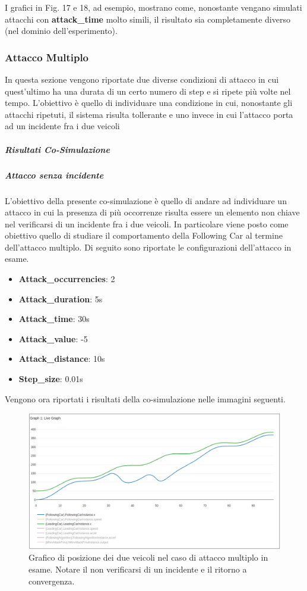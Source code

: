 I grafici in Fig. 17 e 18, ad esempio, mostrano come, nonostante vengano simulati attacchi con \textbf{attack\_time} molto simili, il risultato sia completamente diverso (nel dominio dell'esperimento).
\subsubsection{Attacco Multiplo}
In questa sezione vengono riportate due diverse condizioni di attacco in cui quest'ultimo ha una durata di un certo numero di step e si ripete più volte nel tempo. L'obiettivo è quello di individuare una condizione in cui, nonostante gli attacchi ripetuti, il sistema risulta tollerante e uno invece in cui l'attacco porta ad un incidente fra i due veicoli
\subparagraph{Risultati Co-Simulazione}
\subparagraph{Attacco senza incidente}
L'obiettivo della presente co-simulazione è quello di andare ad individuare un attacco in cui la presenza di più occorrenze risulta essere un elemento non chiave nel verificarsi di un incidente fra i due veicoli. In particolare viene posto come obiettivo quello di studiare il comportamento della Following Car al termine dell'attacco multiplo. Di seguito sono riportate le configurazioni dell'attacco in esame.
\begin{itemize}
	\item \textbf{Attack\_occurrencies}: 2
	\item \textbf{Attack\_duration}: 5s
	\item \textbf{Attack\_time}: 30s
	\item \textbf{Attack\_value}: -5
	\item \textbf{Attack\_distance}: 10s
	\item \textbf{Step\_size}: 0.01s
\end{itemize}
Vengono ora riportati i risultati della co-simulazione nelle immagini seguenti.

\begin{figure}[H]
	\centering
	\includegraphics[width=\textwidth]{img/MultiAttackAccelPlotXNoCrash.png}
	\caption{Grafico di posizione dei due veicoli nel caso di attacco multiplo in esame. Notare il non verificarsi di un incidente e il ritorno a convergenza.}
\end{figure}

